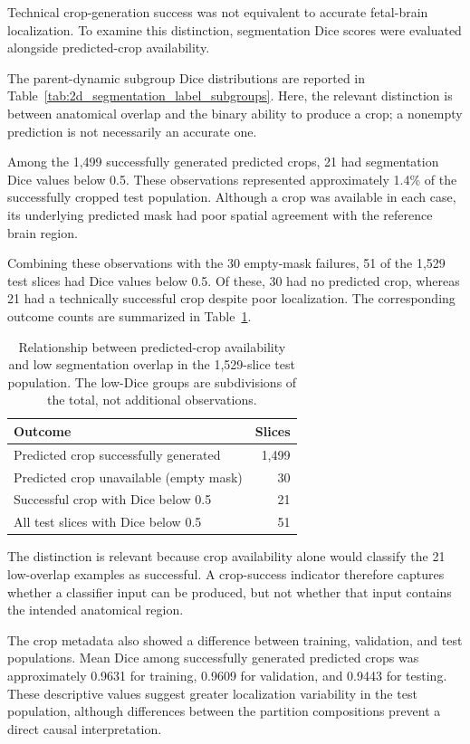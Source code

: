Technical crop-generation success was not equivalent to accurate fetal-brain localization. To examine this distinction, segmentation Dice scores were evaluated alongside predicted-crop availability.

The parent-dynamic subgroup Dice distributions are reported in Table~\ref{tab:2d_segmentation_label_subgroups}. Here, the relevant distinction is between anatomical overlap and the binary ability to produce a crop; a nonempty prediction is not necessarily an accurate one.

Among the 1,499 successfully generated predicted crops, 21 had segmentation Dice values below 0.5. These observations represented approximately 1.4\% of the successfully cropped test population. Although a crop was available in each case, its underlying predicted mask had poor spatial agreement with the reference brain region.

Combining these observations with the 30 empty-mask failures, 51 of the 1,529 test slices had Dice values below 0.5. Of these, 30 had no predicted crop, whereas 21 had a technically successful crop despite poor localization. The corresponding outcome counts are summarized in Table~\ref{tab:roi_low_dice}.

\begin{table}[htbp]
\centering
\caption{Relationship between predicted-crop availability and low segmentation overlap in the 1,529-slice test population. The low-Dice groups are subdivisions of the total, not additional observations.}
\label{tab:roi_low_dice}
\begin{tabular}{lr}
\hline
Outcome & Slices \\
\hline
Predicted crop successfully generated & 1,499 \\
Predicted crop unavailable (empty mask) & 30 \\
Successful crop with Dice below 0.5 & 21 \\
All test slices with Dice below 0.5 & 51 \\
\hline
\end{tabular}
\end{table}

The distinction is relevant because crop availability alone would classify the 21 low-overlap examples as successful. A crop-success indicator therefore captures whether a classifier input can be produced, but not whether that input contains the intended anatomical region.

The crop metadata also showed a difference between training, validation, and test populations. Mean Dice among successfully generated predicted crops was approximately 0.9631 for training, 0.9609 for validation, and 0.9443 for testing. These descriptive values suggest greater localization variability in the test population, although differences between the partition compositions prevent a direct causal interpretation.

